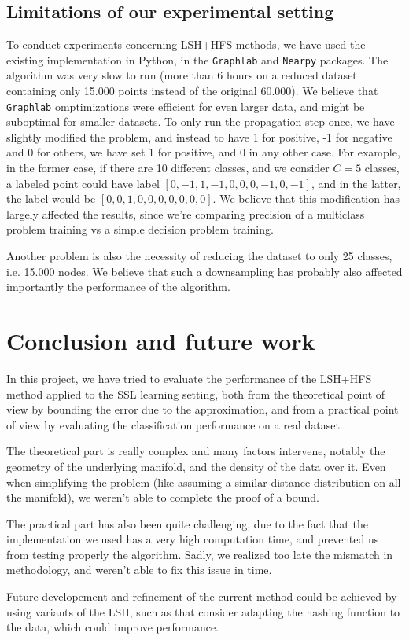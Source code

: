 \documentclass{article} %
\begin{document}
\subsection{Limitations of our experimental setting}
To conduct experiments concerning LSH+HFS methods, we have used the existing implementation in Python, in the \texttt{Graphlab} and \texttt{Nearpy} packages. The algorithm was very slow to run (more than 6 hours on a reduced dataset containing only 15.000 points instead of the original 60.000). We believe that \texttt{Graphlab} omptimizations were efficient for even larger data, and might be suboptimal for smaller datasets. To only run the propagation step once, we have slightly modified the problem, and instead to have 1 for positive, -1 for negative and 0 for others, we have set 1 for positive, and 0 in any other case. For example, in the former case, if there are 10 different classes, and we consider $C=5$ classes, a labeled point could have label $[0, -1, 1, -1, 0, 0, 0, -1, 0, -1]$, and in the latter, the label would be $[0, 0, 1, 0, 0, 0, 0, 0, 0, 0]$. We believe that this modification has largely affected the results, since we're comparing precision of a multiclass problem training vs a simple 
decision problem training.

Another problem is also the necessity of reducing the dataset to only 25 classes, i.e. 15.000 nodes. We believe that such a downsampling has probably also affected importantly the performance of the algorithm.

\section{Conclusion and future work}

In this project, we have tried to evaluate the performance of the LSH+HFS method applied to the SSL learning setting, both from the theoretical point of view by bounding the error due to the approximation, and from a practical point of view by evaluating the classification performance on a real dataset.

The theoretical part is really complex and many factors intervene, notably the geometry of the underlying manifold, and the density of the data over it. Even when simplifying the problem (like assuming a similar distance distribution on all the manifold), we weren't able to complete the proof of a bound.

The practical part has also been quite challenging, due to the fact that the implementation we used has a very high computation time, and prevented us from testing properly the algorithm. Sadly, we realized too late the mismatch in methodology, and weren't able to fix this issue in time.

Future developement and refinement of the current method could be achieved by using variants of the LSH, such as \cite{andoni2015optimal, andoni2014beyond} that consider adapting the hashing function to the data, which could improve performance. 


\end{document}
